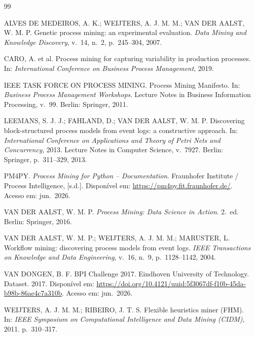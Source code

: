 \documentclass[12pt,a4paper]{article}
\begin{document}
\renewcommand{\refname}{Referências}
\begin{thebibliography}{99}

ALVES DE MEDEIROS, A. K.; WEIJTERS, A. J. M. M.; VAN DER AALST, W. M. P\@.
Genetic process mining: an experimental evaluation.
\textit{Data Mining and Knowledge Discovery}, v.~14, n.~2, p.~245--304, 2007.

CARO, A. et al.
Process mining for capturing variability in production processes.
In: \textit{International Conference on Business Process Management}, 2019.

IEEE TASK FORCE ON PROCESS MINING\@.
Process Mining Manifesto.
In: \textit{Business Process Management Workshops}.
Lecture Notes in Business Information Processing, v.~99. Berlin: Springer, 2011.

LEEMANS, S. J. J.; FAHLAND, D.; VAN DER AALST, W. M. P\@.
Discovering block-structured process models from event logs: a constructive approach.
In: \textit{International Conference on Applications and Theory of Petri Nets and Concurrency}, 2013.
Lecture Notes in Computer Science, v.~7927. Berlin: Springer, p.~311--329, 2013.

PM4PY\@. \textit{Process Mining for Python -- Documentation}.
Fraunhofer Institute / Process Intelligence, [s.d.].
Disponível em: \url{https://pm4py.fit.fraunhofer.de/}. Acesso em: jun.~2026.

VAN DER AALST, W. M. P\@.
\textit{Process Mining: Data Science in Action}. 2.~ed. Berlin: Springer, 2016.

VAN DER AALST, W. M. P.; WEIJTERS, A. J. M. M.; MARUSTER, L\@.
Workflow mining: discovering process models from event logs.
\textit{IEEE Transactions on Knowledge and Data Engineering}, v.~16, n.~9, p.~1128--1142, 2004.

VAN DONGEN, B. F\@. BPI Challenge 2017. Eindhoven University of Technology. Dataset. 2017.
Disponível em: \url{https://doi.org/10.4121/uuid:5f3067df-f10b-45da-b98b-86ae4c7a310b}.
Acesso em: jun.~2026.

WEIJTERS, A. J. M. M.; RIBEIRO, J. T. S\@.
Flexible heuristics miner (FHM).
In: \textit{IEEE Symposium on Computational Intelligence and Data Mining (CIDM)}, 2011. p.~310--317.

\end{thebibliography}
\end{document}
